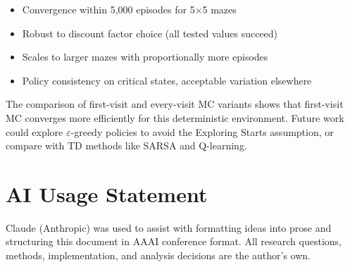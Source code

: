 \documentclass[letterpaper]{article}
\begin{document}
\begin{itemize}
    \item Convergence within 5,000 episodes for 5$\times$5 mazes
    \item Robust to discount factor choice (all tested values succeed)
    \item Scales to larger mazes with proportionally more episodes
    \item Policy consistency on critical states, acceptable variation elsewhere
\end{itemize}

The comparison of first-visit and every-visit MC variants shows that first-visit MC converges more efficiently for this deterministic environment. Future work could explore $\varepsilon$-greedy policies to avoid the Exploring Starts assumption, or compare with TD methods like SARSA and Q-learning.

\section*{AI Usage Statement}

Claude (Anthropic) was used to assist with formatting ideas into prose and structuring this document in AAAI conference format. All research questions, methods, implementation, and analysis decisions are the author's own.


\end{document}
